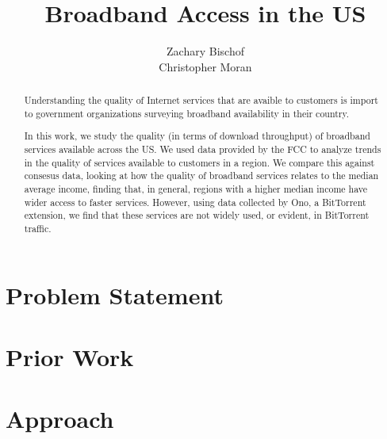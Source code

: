 \documentclass{sig-alternate-10pt}
\begin{document}
\title{Broadband Access in the US}
\author{
Zachary Bischof\\
Christopher Moran
}
  
\maketitle

\begin{abstract}
 
Understanding the quality of Internet services that are avaible to customers is
import to government organizations surveying broadband availability in their 
country.

In this work, we study the quality (in terms of download throughput) of
broadband services available across the US. We used data provided by the FCC to
analyze trends in the quality of services available to customers in a region.
We compare this against consesus data, looking at how the quality of broadband
services relates to the median average income, finding that, in general,
regions with a higher median income have wider access to faster services.
However, using data collected by Ono, a BitTorrent extension, we find that
these services are not widely used, or evident, in BitTorrent traffic.

\end{abstract}


\section{Problem Statement}
\label{sec:statement} 



\section{Prior Work}
\label{sec:prior-work}


 
\section{Approach}
\label{sec:approach} 
\end{document}
